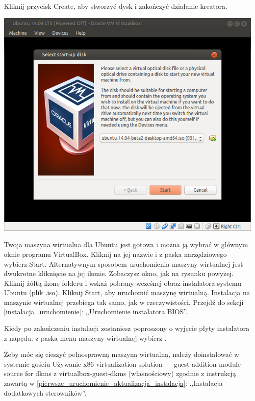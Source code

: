 Kliknij przycisk \textcolor{ubuntu_orange}{Create}, aby stworzyć dysk i zakończyć działanie kreatora.
\clearpage
\begin{center}
	\includegraphics[width=\linewidth]{images/virtualbox_start.png}
\end{center}

Twoja maszyna wirtualna dla Ubuntu jest gotowa i można ją wybrać w głównym oknie programu VirtualBox. Kliknij na jej nazwie i z paska narzędziowego wybierz \textcolor{ubuntu_orange}{Start}. Alternatywnym sposobem uruchomienia maszyny wirtualnej jest dwukrotne kliknięcie na jej ikonie. Zobaczysz okno, jak na rysunku powyżej. Kliknij żółtą ikonę folderu i wskaż pobrany wcześnej obraz instalatora systemu Ubuntu (plik .iso). Kliknij \textcolor{ubuntu_orange}{Start}, aby uruchomić maszynę wirtualną. Instalacja na maszynie wirtualnej przebiega tak samo, jak w rzeczywistości. Przejdź do sekcji \ref{instalacja_uruchomienie}: ,,Uruchomienie instalatora BIOS''.

Kiedy po zakończeniu instalacji zostaniesz poproszony o wyjęcie płyty instalatora z napędu, z paska menu maszyny wirtualnej wybierz .

Żeby móc się cieszyć pełnosprawną maszyną wirtualną, należy doinstalować w systemie-gościu \textcolor{ubuntu_orange}{Używanie x86 virtualization solution --- guest addition module source for dkms z virtualbox-guest-dkms (własnościowy)} zgodnie z instrukcją zawartą w \ref{pierwsze_uruchomienie_aktualizacja_instalacja}: ,,Instalacja dodatkowych sterowników''.
